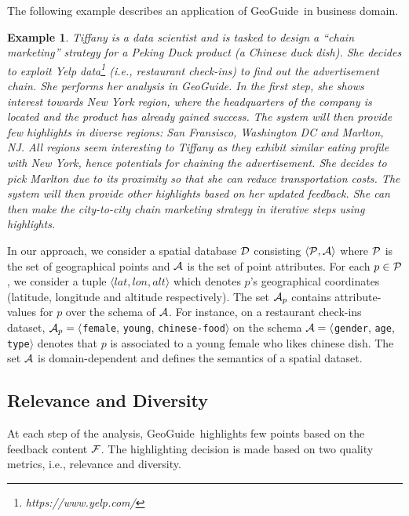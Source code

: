 \documentclass[conference,compsoc]{IEEEtran}
\newtheorem{example}{Example}
\newcommand{\framework}{{\sc GeoGuide}}
\begin{document}
The following example describes an application of \framework\ in business domain.

\begin{example}
\label{ex:flight}
Tiffany is a data scientist and is tasked to design a ``chain marketing'' strategy for a Peking Duck product (a Chinese duck dish). She decides to exploit Yelp data\footnote{\it https://www.yelp.com/} (i.e., restaurant check-ins) to find out the advertisement chain. She performs her analysis in \framework. In the first step, she shows interest towards New York region, where the headquarters of the company is located and the product has already gained success. The system will then provide few highlights in diverse regions: San Fransisco, Washington DC and Marlton, NJ. All regions seem interesting to Tiffany as they exhibit similar eating profile with New York, hence potentials for chaining the advertisement. She decides to pick Marlton due to its proximity so that she can reduce transportation costs. The system will then provide other highlights based on her updated feedback. She can then make the city-to-city chain marketing strategy in iterative steps using highlights.
\end{example}


In our approach, we consider a spatial database ${\cal D}$ consisting $\langle {\cal P}, {\cal A} \rangle$ where ${\cal P}$ is the set of
geographical points and ${\cal A}$ is the set of point attributes. For each $p \in {\cal P}$, we consider a tuple $\langle lat, lon, alt\rangle$ which denotes $p$'s geographical coordinates (latitude, longitude and altitude respectively). The set ${\cal A}_p$ contains attribute-values for $p$ over the schema of ${\cal A}$. For instance, on a restaurant check-ins dataset, ${\cal A}_p = \langle${\tt female}, {\tt young}, {\tt chinese-food}$\rangle$ on the schema ${\cal A} = \langle${\tt gender}, {\tt age}, {\tt type}$\rangle$ denotes that $p$ is associated to a young female who likes chinese dish. The set ${\cal A}$ is domain-dependent and defines the semantics of a spatial dataset.


\subsection{Relevance and Diversity}

At each step of the analysis, \framework\ highlights few points based on the feedback content ${\cal F}$. The highlighting decision is made based on two quality metrics, i.e., relevance and diversity. 
\end{document}
